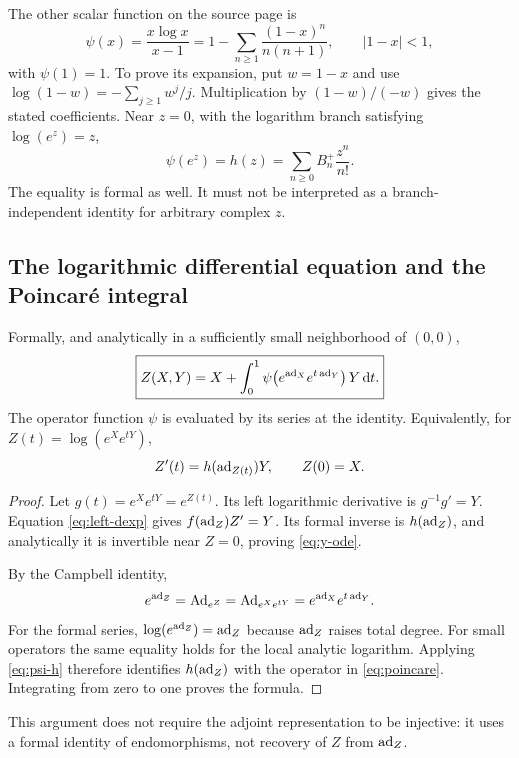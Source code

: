 The other scalar function on the source page is
\begin{equation}\label{eq:psi}
 \psi(x)=\frac{x\log x}{x-1}
 =1-\sum_{n\geq1}\frac{(1-x)^n}{n(n+1)},\qquad |1-x|<1,
\end{equation}
with $\psi(1)=1$. To prove its expansion, put $w=1-x$ and use
$\log(1-w)=-\sum_{j\geq1}w^j/j$. Multiplication by $(1-w)/(-w)$ gives the stated coefficients. Near $z=0$, with the logarithm branch satisfying $\log(e^z)=z$,
\begin{equation}\label{eq:psi-h}
 \psi(e^z)=h(z)=\sum_{n\geq0}B_n^+\frac{z^n}{n!}.
\end{equation}
The equality is formal as well. It must not be interpreted as a branch-independent identity for arbitrary complex $z$.

\subsection{The logarithmic differential equation and the Poincar\'e integral}
\begin{theorem}\label{thm:integral}
Formally, and analytically in a sufficiently small neighborhood of $(0,0)$,
\begin{equation}\label{eq:poincare}
 \boxed{\displaystyle
 Z(X,Y)=X+\int_0^1
 \psi\!\left(e^{\operatorname{ad}_X}e^{t\operatorname{ad}_Y}\right)Y\,\mathrm d t.}
\end{equation}
The operator function $\psi$ is evaluated by its series at the identity. Equivalently, for $Z(t)=\log(e^Xe^{tY})$,
\begin{equation}\label{eq:y-ode}
 Z'(t)=h(\operatorname{ad}_{Z(t)})Y,\qquad Z(0)=X.
\end{equation}
\end{theorem}
\begin{proof}
Let $g(t)=e^Xe^{tY}=e^{Z(t)}$. Its left logarithmic derivative is $g^{-1}g'=Y$. Equation \cref{eq:left-dexp} gives
$f(\operatorname{ad}_Z)Z'=Y$. Its formal inverse is $h(\operatorname{ad}_Z)$, and analytically it is invertible near $Z=0$, proving \cref{eq:y-ode}.

By the Campbell identity,
\[
 e^{\operatorname{ad}_Z}=\operatorname{Ad}_{e^Z}=\operatorname{Ad}_{e^Xe^{tY}}
 =e^{\operatorname{ad}_X}e^{t\operatorname{ad}_Y}.
\]
For the formal series, $\log(e^{\operatorname{ad}_Z})=\operatorname{ad}_Z$ because $\operatorname{ad}_Z$ raises total degree. For small operators the same equality holds for the local analytic logarithm. Applying \cref{eq:psi-h} therefore identifies $h(\operatorname{ad}_Z)$ with the operator in \cref{eq:poincare}. Integrating from zero to one proves the formula.
\end{proof}
This argument does not require the adjoint representation to be injective: it uses a formal identity of endomorphisms, not recovery of $Z$ from $\operatorname{ad}_Z$.

